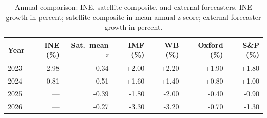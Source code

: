 \begin{table}[H]
\centering\small
\caption{Annual comparison: INE, satellite composite, and external forecasters. INE growth in percent; satellite composite in mean annual z-score; external forecaster growth in percent.}
\label{tab:sat_vs_ine}
\begin{tabular}{lrrrrrr}
\toprule
Year & INE (\%) & Sat.\ mean $z$ & IMF (\%) & WB (\%) & Oxford (\%) & S\&P (\%) \\
\midrule
2023 & +2.98 & -0.34 & +2.00 & +2.20 & +1.90 & +1.80 \\
2024 & +0.81 & -0.51 & +1.60 & +1.40 & +0.80 & +1.00 \\
2025 & --- & -0.39 & -1.80 & -2.00 & -0.40 & -0.90 \\
2026 & --- & -0.27 & -3.30 & -3.20 & -0.70 & -1.30 \\
\bottomrule
\end{tabular}
\end{table}